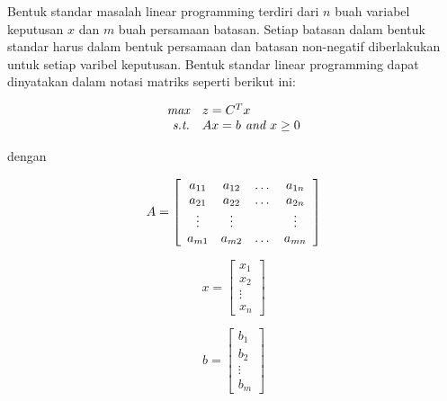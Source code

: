 Bentuk standar masalah linear programming terdiri dari $n$ buah variabel keputusan $x$ dan $m$ buah persamaan batasan. Setiap batasan dalam bentuk standar harus dalam bentuk persamaan dan batasan non-negatif diberlakukan untuk setiap varibel keputusan. Bentuk standar linear programming dapat dinyatakan dalam notasi matriks seperti berikut ini:
        
\begin{equation*}
	\begin{array}{r l}
    	\textit{max}   & z=C^Tx \\
        \textit{s.t.} & Ax=b \textit{ and } x\geq0
	\end{array}    
\end{equation*}

dengan


\begin{equation*}
	A = \left[
	\begin{array}{c c c c}
    	a_{11} & a_{12} & \dots & a_{1n}\\
    	a_{21} & a_{22} & \dots & a_{2n}\\
    	\vdots & \vdots & & \vdots\\
    	a_{m1} & a_{m2} & \dots & a_{mn}
	\end{array}
	\right]    
\end{equation*}

\begin{equation*}
	x = \left[
	\begin{array}{c}
    	x_1\\
    	x_2\\
    	\vdots\\
    	x_n
	\end{array}
	\right]    
\end{equation*}

\begin{equation*}
	b = \left[
	\begin{array}{c}
    	b_1\\
    	b_2\\
    	\vdots\\
    	b_m
	\end{array}
	\right]    
\end{equation*}

